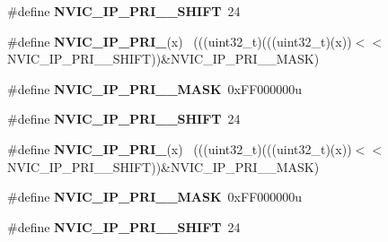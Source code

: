 \begin{DoxyCompactItemize}
\item 
\hypertarget{group___n_v_i_c___register___masks_ga776c73ffc75170acf87f8bb3cf86ba6a}{}\#define {\bfseries N\+V\+I\+C\+\_\+\+I\+P\+\_\+\+P\+R\+I\+\_\+\_\+\+S\+H\+I\+F\+T}~24\label{group___n_v_i_c___register___masks_ga776c73ffc75170acf87f8bb3cf86ba6a}

\item 
\hypertarget{group___n_v_i_c___register___masks_gafac7e1a5c7d7bbd66985404cefe158ff}{}\#define {\bfseries N\+V\+I\+C\+\_\+\+I\+P\+\_\+\+P\+R\+I\+\_}(x)                                            ~(((uint32\+\_\+t)(((uint32\+\_\+t)(x))$<$$<$N\+V\+I\+C\+\_\+\+I\+P\+\_\+\+P\+R\+I\+\_\+\_\+\+S\+H\+I\+F\+T))\&N\+V\+I\+C\+\_\+\+I\+P\+\_\+\+P\+R\+I\+\_\+\_\+\+M\+A\+S\+K)\label{group___n_v_i_c___register___masks_gafac7e1a5c7d7bbd66985404cefe158ff}

\item 
\hypertarget{group___n_v_i_c___register___masks_gad864335f4d314be1c523a3c03ccfb7fb}{}\#define {\bfseries N\+V\+I\+C\+\_\+\+I\+P\+\_\+\+P\+R\+I\+\_\+\_\+\+M\+A\+S\+K}~0x\+F\+F000000u\label{group___n_v_i_c___register___masks_gad864335f4d314be1c523a3c03ccfb7fb}

\item 
\hypertarget{group___n_v_i_c___register___masks_ga184d91d952f768db5f9df425bc4e2d5a}{}\#define {\bfseries N\+V\+I\+C\+\_\+\+I\+P\+\_\+\+P\+R\+I\+\_\+\_\+\+S\+H\+I\+F\+T}~24\label{group___n_v_i_c___register___masks_ga184d91d952f768db5f9df425bc4e2d5a}

\item 
\hypertarget{group___n_v_i_c___register___masks_ga92202e88cfcb39250346ea7f3f297f44}{}\#define {\bfseries N\+V\+I\+C\+\_\+\+I\+P\+\_\+\+P\+R\+I\+\_}(x)                                            ~(((uint32\+\_\+t)(((uint32\+\_\+t)(x))$<$$<$N\+V\+I\+C\+\_\+\+I\+P\+\_\+\+P\+R\+I\+\_\+\_\+\+S\+H\+I\+F\+T))\&N\+V\+I\+C\+\_\+\+I\+P\+\_\+\+P\+R\+I\+\_\+\_\+\+M\+A\+S\+K)\label{group___n_v_i_c___register___masks_ga92202e88cfcb39250346ea7f3f297f44}

\item 
\hypertarget{group___n_v_i_c___register___masks_ga6bc8292c72e770b70906d30e2c712e38}{}\#define {\bfseries N\+V\+I\+C\+\_\+\+I\+P\+\_\+\+P\+R\+I\+\_\+\_\+\+M\+A\+S\+K}~0x\+F\+F000000u\label{group___n_v_i_c___register___masks_ga6bc8292c72e770b70906d30e2c712e38}

\item 
\hypertarget{group___n_v_i_c___register___masks_ga55c83c35b77e5394b26be4a54a25df8b}{}\#define {\bfseries N\+V\+I\+C\+\_\+\+I\+P\+\_\+\+P\+R\+I\+\_\+\_\+\+S\+H\+I\+F\+T}~24\label{group___n_v_i_c___register___masks_ga55c83c35b77e5394b26be4a54a25df8b}


\end{DoxyCompactItemize}
